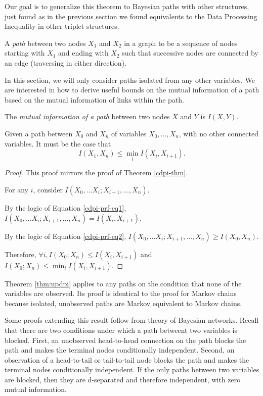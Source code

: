 \documentclass[../thesis.tex]{subfiles}
\begin{document}
Our goal is to generalize this theorem to Bayesian paths
with other structures, just found as in the previous section
we found equivalents to the Data Processing Inequality in
other triplet structures.

\begin{dfn}[Path]
A \emph{path} between two nodes \(X_1\) and \(X_2\) in a graph 
to be a sequence of nodes starting with \(X_1\) and ending with \(X_2\)
such that successive nodes are connected by an edge (traversing
in either direction).
\end{dfn}

In this section, we will only consider paths isolated from
any other variables.
We are interested in how to derive useful bounds on the
mutual information of a path based on the mutual information
of links within the path.

\begin{dfn}
  The \emph{mutual information of a path} between two nodes \(X\) and \(Y\)
  is $I(X,Y)$.
\end{dfn}

\begin{thm}
  \label{thm:updpi}
  Given a path between $X_0$ and $X_n$
  of variables $X_0, ..., X_n$, with no other connected variables.
  It must be the case that
  $$I(X_1,X_n) \leq \min_{i} I(X_i,X_{i+1}).$$
\end{thm}
\begin{proof}
  This proof mirrors the proof of Theorem \ref{cdpi-thm}.
  
  For any $i$, consider $I(X_0,...X_i;X_{i+1},...,X_n)$.

  By the logic of Equation \ref{cdpi-prf-eq1},
  $I(X_0,...X_i;X_{i+1},...,X_n) = I(X_i,X_{i+1})$.

  By the logic of Equation \ref{cdpi-prf-eq2},
  $I(X_0,...X_i;X_{i+1},...,X_n) \geq I(X_0,X_n)$.

  Therefore, $\forall i, I(X_0;X_n) \leq I(X_i,X_{i+1})$
  and $I(X_0;X_n) \leq \min_i I(X_i,X_{i+1})$.
\end{proof}

Theorem \ref{thm:updpi} applies to any paths on the condition
that none of the variables are observed.
Its proof is identical to the proof for Markov chains because
isolated, unobserved paths are Markov equivalent to Markov chains.

Some proofs extending this result follow from theory of Bayesian
networks. Recall that there are two conditions under which a
path betweent two variables is blocked.
First, an unobserved head-to-head connection on the
path blocks the path and makes the terminal nodes conditionally
independent. Second, an observation of a head-to-tail or tail-to-tail
node blocks the path and makes the terminal nodes conditionally
independent.
If the only paths between two variables are blocked, then they
are d-separated and therefore independent, with zero mutual information.
\end{document}
